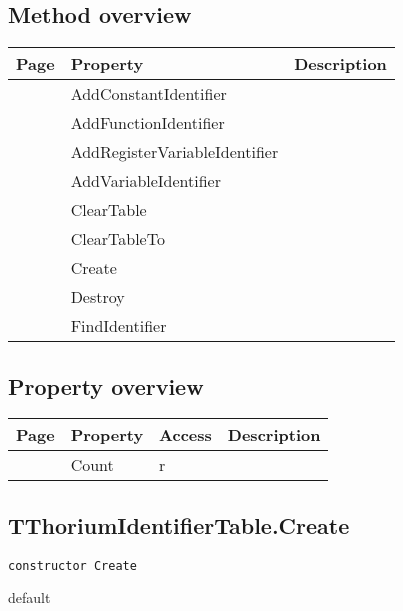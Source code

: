 \subsection{Method overview}
\label{thoriumcorepkg:thorium:tthoriumidentifiertable:methods}
\begin{tabularx}{\textwidth}{llX}
Page & Property & Description  \\ \hline
\pageref{thoriumcorepkg:thorium:tthoriumidentifiertable:addconstantidentifier} & AddConstantIdentifier  &  \\
\pageref{thoriumcorepkg:thorium:tthoriumidentifiertable:addfunctionidentifier} & AddFunctionIdentifier  &  \\
\pageref{thoriumcorepkg:thorium:tthoriumidentifiertable:addregistervariableidentifier} & AddRegisterVariableIdentifier  &  \\
\pageref{thoriumcorepkg:thorium:tthoriumidentifiertable:addvariableidentifier} & AddVariableIdentifier  &  \\
\pageref{thoriumcorepkg:thorium:tthoriumidentifiertable:cleartable} & ClearTable  &  \\
\pageref{thoriumcorepkg:thorium:tthoriumidentifiertable:cleartableto} & ClearTableTo  &  \\
\pageref{thoriumcorepkg:thorium:tthoriumidentifiertable:create} & Create  &  \\
\pageref{thoriumcorepkg:thorium:tthoriumidentifiertable:destroy} & Destroy  &  \\
\pageref{thoriumcorepkg:thorium:tthoriumidentifiertable:findidentifier} & FindIdentifier  &  \\
\hline
\end{tabularx}
\subsection{Property overview}
\label{thoriumcorepkg:thorium:tthoriumidentifiertable:properties}
\begin{tabularx}{\textwidth}{lllX}
Page & Property & Access & Description \\ \hline
\pageref{thoriumcorepkg:thorium:tthoriumidentifiertable:count} & Count & r &  \\
\hline
\end{tabularx}
\subsection{TThoriumIdentifierTable.Create}
\label{thoriumcorepkg:thorium:tthoriumidentifiertable:create}
\begin{FPCList}
\Declaration 

\begin{verbatim}
constructor Create
\end{verbatim}
\Visibility
default
\end{FPCList}

